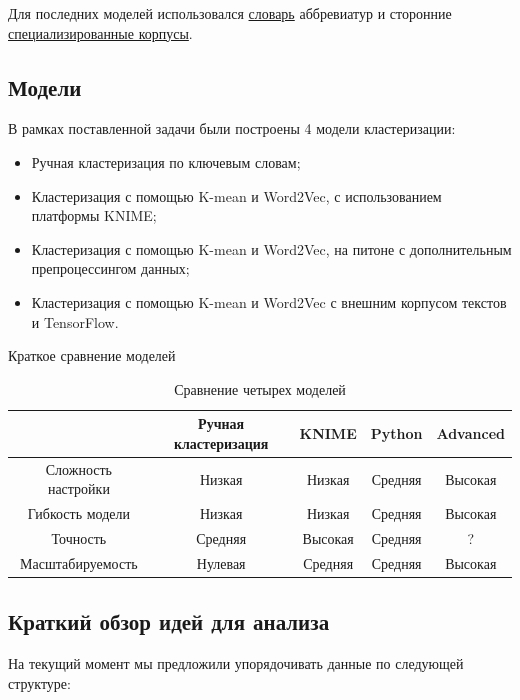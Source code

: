 \documentclass{article}
\begin{document}
Для последних моделей использовался \href{http://www.tech.nftn.ru/dir/c/22}{словарь}
аббревиатур и сторонние \href{https://rusvectores.org/ru/}{специализированные корпусы}.


\newpage

\subsection{Модели}
В рамках поставленной задачи были построены 4 модели кластеризации:
\begin{itemize}
    \item Ручная кластеризация по ключевым словам;
    \item Кластеризация с помощью K-mean и Word2Vec, с использованием платформы KNIME;
    \item Кластеризация с помощью K-mean и Word2Vec, на питоне с дополнительным препроцессингом данных;
    \item Кластеризация с помощью K-mean и Word2Vec с внешним корпусом текстов и TensorFlow.
\end{itemize}

Краткое сравнение моделей

\begin{table}[h!]
    \centering
    \begin{tabular}{|c|c|c|c|c|}
    \hline
                        & Ручная кластеризация & KNIME  & Python  & Advanced  \\ \hline
    Сложность настройки & Низкая               & Низкая & Средняя & Высокая   \\ \hline
    Гибкость модели     & Низкая               & Низкая & Средняя & Высокая   \\ \hline
    Точность            & Средняя              & Высокая& Средняя & ?         \\ \hline
    Масштабируемость    & Нулевая              & Средняя& Средняя & Высокая   \\ \hline
    \end{tabular}
    \caption{Сравнение четырех моделей}
    \label{tab:my_label}
\end{table}

\subsection{Краткий обзор идей для анализа}

На текущий момент мы предложили упорядочивать данные по следующей структуре:
\end{document}
